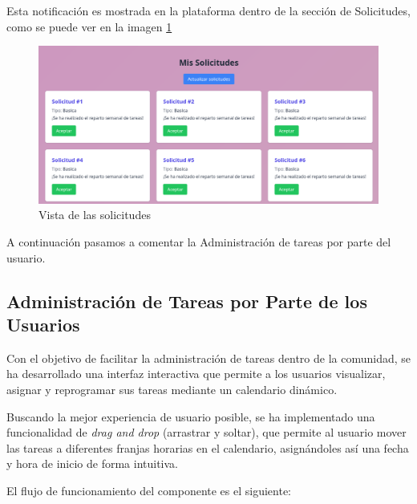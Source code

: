 Esta notificación es mostrada en la plataforma dentro de la sección de Solicitudes, como se puede ver en la imagen
\ref{fig:solicitudes}
\begin{figure}[H]
  \centering
  \includegraphics[width=1\textwidth]{fotos/solicitudes-memoria.png}
  \caption{Vista de las solicitudes}
  \label{fig:solicitudes}
\end{figure}

A continuación pasamos a comentar la Administración de tareas por parte del usuario.
\vspace{0.5em}
\subsection{Administración de Tareas por Parte de los Usuarios}

Con el objetivo de facilitar la administración de tareas dentro de la comunidad, se ha desarrollado una interfaz interactiva que permite a los usuarios visualizar, asignar y reprogramar sus tareas mediante un calendario dinámico.

Buscando la mejor experiencia de usuario posible, se ha implementado una funcionalidad de \textit{drag and drop} (arrastrar y soltar), que permite al usuario mover las tareas a diferentes franjas horarias en el calendario, asignándoles así una fecha y hora de inicio de forma intuitiva.

El flujo de funcionamiento del componente es el siguiente:

